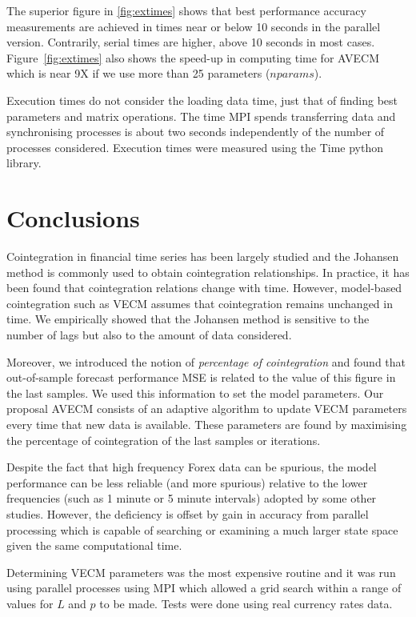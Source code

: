 The superior figure in \ref{fig:extimes} shows that best performance accuracy
measurements are achieved in times near or below 10 seconds in the parallel
version. Contrarily, serial times are higher, above 10 seconds in most cases.
Figure~\ref{fig:extimes} also shows the speed-up in computing time for AVECM
which is near 9X if we use more than 25 parameters ($nparams$).

Execution times do not consider the loading data time, just that of finding best
parameters and matrix operations. The time MPI spends transferring data and
synchronising processes is about two seconds independently of the number of
processes considered. Execution times were measured using the Time python
library.

\section{Conclusions}
\label{sec:51conclusions}
Cointegration in financial time series has been largely studied and the Johansen
method is commonly used to obtain cointegration relationships. In practice, it
has been found that cointegration relations change with time. However,
model-based cointegration such as VECM assumes that cointegration remains
unchanged in time. We empirically showed that the Johansen method is sensitive
to the number of lags but also to the amount of data considered.

Moreover, we introduced the notion of {\em percentage of cointegration\/} and
found that out-of-sample forecast performance MSE is related to the value of
this figure in the last samples.  We used this information to set the model
parameters.  Our proposal AVECM consists of an adaptive algorithm to update VECM
parameters every time that new data is available. These parameters are found by
maximising the percentage of cointegration of the last samples or iterations.

Despite the fact that high frequency Forex data can be spurious, the model
performance can be less reliable (and more spurious) relative to the lower
frequencies (such as 1 minute or 5 minute intervals) adopted by some other
studies. However, the deficiency is offset by gain in accuracy from parallel
processing which is capable of searching or examining a much larger state space
given the same computational time.

Determining VECM parameters was the most expensive routine and it was run using
parallel processes using MPI which allowed a grid search within a range of
values for $L$ and $p$ to be made.  Tests were done using real currency rates
data.  

